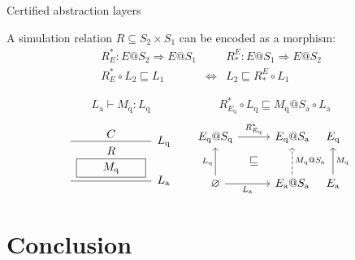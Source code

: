 \documentclass{beamer}
\newcommand{\kw}[1]{\ensuremath{ \mathrm{#1} }}
\begin{document}
\begin{frame}[fragile]{Certified abstraction layers} %
  \begin{definition}
    A simulation relation $R \subseteq S_2 \times S_1$
    can be encoded as a morphism:
    \[
      \begin{array}{ccc}
        R^*_E : E@S_2 \Rightarrow E@S_1 & &
        R_*^E : E@S_1 \Rightarrow E@S_2 \\[1ex]
        R^*_E \circ L_2 \sqsubseteq L_1 &
        \Leftrightarrow &
        L_2 \sqsubseteq R_*^E \circ L_1
      \end{array}
    \]
  \end{definition}
  \pause
  \begin{example}
    \[
        L_\kw{a} \vdash M_\kw{q} : L_\kw{q} \qquad \qquad \qquad
        R^*_{E_\kw{q}} \circ L_\kw{q} \sqsubseteq
          M_\kw{q}@S_\kw{a} \circ L_\kw{a}
    \]
    \[
      \begin{prooftree}
        \hypo{C}
        \infer1[$L_\kw{q}$]{\begin{array}{c}R \\ \fbox{$\qquad M_\kw{q} \qquad$}\end{array}}
        \infer1[$L_\kw{a}$]{}
      \end{prooftree}
      \qquad
      \begin{tikzcd}[sep=tiny]
        E_\kw{q}@S_\kw{q} \ar[rr, "R^*_{E_\kw{q}}"] & &
        E_\kw{q}@S_\kw{a} & E_\kw{q} \\
        & \sqsubseteq & & \\
        \varnothing \ar[uu, "L_\kw{q}"] \ar[rr, "L_\kw{a}"'] & &
        E_\kw{a}@S_\kw{a} \ar[uu, "M_\kw{q}@S_\kw{a}"', dashed] &
        E_\kw{a} \ar[uu, "M_\kw{q}"']
      \end{tikzcd} 
    \]
  \end{example}
\end{frame}


\section*{Conclusion} %
\end{document}
